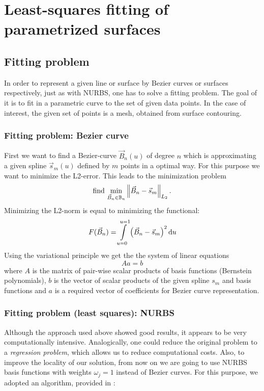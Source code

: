 \section{Least-squares fitting of parametrized surfaces}

\subsection{Fitting problem}
In order to represent a given line or surface by Bezier curves or surfaces respectively, just as with NURBS, one has to solve a fitting problem. The goal of it is to fit in a parametric curve to the set of given data points. In the case of interest, the given set of points is a mesh, obtained from surface contouring.
\subsubsection{Fitting problem: Bezier curve}
First we want to find a Bezier-curve $\vec{B}_n\left(u\right)$ of degree $n$ which is approximating a given spline $\vec{s}_m\left(u\right)$ defined by $m$ points in a optimal way. For this purpose we want to minimize the L2-error. This leads to the minimization problem
\begin{equation}
\text{find\ } \underset{\vec{B}_n\in \mathbb{B}_n}{\min} \Ltwonorm{\vec{B}_n-\vec{s}_m}.
\end{equation}
Minimizing the L2-norm is equal to minimizing the functional:
\begin{equation}
F(\vec{B}_n)=\int\limits_{u=0}^{u=1} \left(\vec{B}_n-\vec{s}_m\right)^2\du
\end{equation}
Using the variational principle we get the the system of linear equations
\begin{equation}
A a = b
\end{equation}
where $A$ is the matrix of pair-wise scalar products of basis functions (Bernstein polynomials), $b$ is the vector of scalar products of the given spline $s_{m}$ and basis functions and $a$ is a required vector of coefficients for Bezier curve representation.

\subsubsection{Fitting problem (least squares): NURBS}
Although the approach used above showed good results, it appears to be very computationally intensive. Analogically, one could reduce the original problem to a \emph{regression problem}, which allows us to reduce computational costs. Also, to improve the locality of our solution, from now on we are going to use NURBS basis functions with weights $\omega_{j} = 1$ instead of Bezier curves. For this purpose, we adopted an algorithm, provided in \cite{becker2011advanced}:

